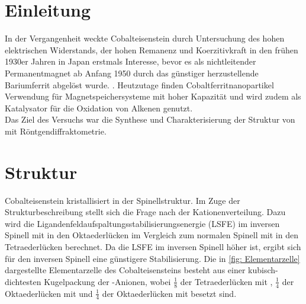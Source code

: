 \documentclass[a4paper,12pt,bibliography=totocnumbered]{scrartcl}
\begin{document}
\clearpage

\renewcommand{\thepage}{\arabic{page}}
\setcounter{page}{1}


\section{Einleitung}
In der Vergangenheit weckte Cobalteisenstein durch Untersuchung des hohen elektrischen Widerstands, der hohen Remanenz und Koerzitivkraft in den frühen 1930er Jahren in Japan erstmals Interesse, bevor es als nichtleitender Permanentmagnet ab Anfang 1950 durch das günstiger herzustellende Bariumferrit abgelöst wurde.
\cite{History}.
Heutzutage finden Cobaltferritnanopartikel Verwendung für Magnetspeichersysteme mit hoher Kapazität und  wird zudem als Katalysator für die Oxidation von Alkenen genutzt. \cite{Rieck} \\
Das Ziel des Versuchs war die Synthese und Charakterisierung der Struktur von  mit Röntgendiffraktometrie.

\section{Struktur}
Cobalteisenstein kristallisiert in der Spinellstruktur. \cite{Rieck} 
Im Zuge der Strukturbeschreibung stellt sich die Frage nach der Kationenverteilung. 
Dazu wird die Ligandenfeldaufspaltungsstabilisierungsenergie (LSFE) im inversen Spinell mit  in den Oktaederlücken im Vergleich zum normalen Spinell mit  in den Tetraederlücken berechnet. 
Da die LSFE im inversen Spinell höher ist, ergibt sich für den inversen Spinell eine günstigere Stabilisierung.
Die in \autoref{fig: Elementarzelle} dargestellte Elementarzelle des Cobalteisensteins besteht aus einer kubisch-dichtesten Kugelpackung der -Anionen, wobei $\frac{1}{8}$ der Tetraederlücken mit , 
$\frac{1}{4}$ der Oktaederlücken mit  und $\frac{1}{4}$ der Oktaederlücken mit  besetzt sind. \\
\end{document}
